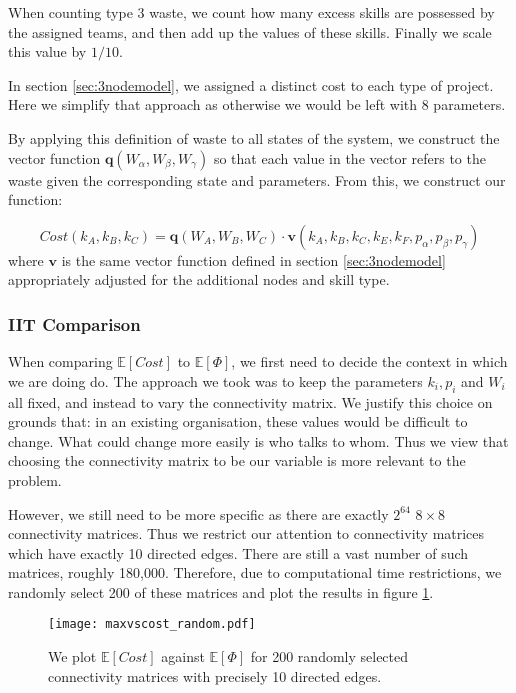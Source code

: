 When counting type 3 waste, we count how many excess skills are possessed by the assigned teams, and then add up the values of these skills. Finally we scale this value by $1/10$.

\begin{remark}
	In section \ref{sec:3nodemodel}, we assigned a distinct cost to each type of project. Here we simplify that approach as otherwise we would be left with 8 parameters.
\end{remark}

By applying this definition of waste to all states of the system, we construct the vector function $\mathbf{q}(W_\alpha, W_\beta, W_\gamma)$ so that each value in the vector refers to the waste given the corresponding state and parameters. From this, we construct our function:

\begin{equation}
\label{eq:cost_function}
Cost(k_A, k_B, k_C) = \mathbf{q}(W_A, W_B, W_C) \cdot \mathbf{v}(k_A, k_B, k_C,k_E, k_F, p_\alpha, p_\beta, p_\gamma)
\end{equation}
where $\mathbf{v}$ is the same vector function defined in section \ref{sec:3nodemodel} appropriately adjusted for the additional nodes and skill type.

\subsubsection{IIT Comparison}

When comparing $\mathbb{E}[Cost]$ to $\mathbb{E}[\Phi]$, we first need to decide the context in which we are doing do. The approach we took was to keep the parameters $k_i, p_i$ and $W_i$ all fixed, and instead to vary the connectivity matrix. We justify this choice on grounds that: in an existing organisation, these values would be difficult to change. What could change more easily is who talks to whom. Thus we view that choosing the connectivity matrix to be our variable is more relevant to the problem.

However, we still need to be more specific as there are exactly $2^{64}$ $8\times 8$ connectivity matrices. Thus we restrict our attention to connectivity matrices which have exactly 10 directed edges. There are still a vast number of such matrices, roughly 180,000. Therefore, due to computational time restrictions, we randomly select 200 of these matrices and plot the results in figure \ref{fig:model_costvsphi}.

\begin{figure}[h!]
	\centering
	\texttt{[image: maxvscost\_random.pdf]}
	\caption{We plot $\mathbb{E}[Cost]$ against $\mathbb{E}[\Phi]$ for 200 randomly selected connectivity matrices with precisely 10 directed edges.}
	\label{fig:model_costvsphi}
\end{figure}


